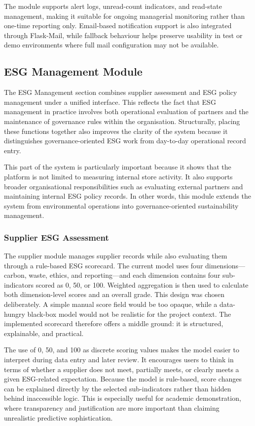 \documentclass[11pt,a4paper]{article}
\begin{document}
The module supports alert logs, unread-count indicators, and read-state management, making it suitable for ongoing managerial monitoring rather than one-time reporting only. Email-based notification support is also integrated through Flask-Mail, while fallback behaviour helps preserve usability in test or demo environments where full mail configuration may not be available.

\subsection{ESG Management Module}
The ESG Management section combines supplier assessment and ESG policy management under a unified interface. This reflects the fact that ESG management in practice involves both operational evaluation of partners and the maintenance of governance rules within the organisation. Structurally, placing these functions together also improves the clarity of the system because it distinguishes governance-oriented ESG work from day-to-day operational record entry.

This part of the system is particularly important because it shows that the platform is not limited to measuring internal store activity. It also supports broader organisational responsibilities such as evaluating external partners and maintaining internal ESG policy records. In other words, this module extends the system from environmental operations into governance-oriented sustainability management.

\subsubsection{Supplier ESG Assessment}
The supplier module manages supplier records while also evaluating them through a rule-based ESG scorecard. The current model uses four dimensions---carbon, waste, ethics, and reporting---and each dimension contains four sub-indicators scored as 0, 50, or 100. Weighted aggregation is then used to calculate both dimension-level scores and an overall grade. This design was chosen deliberately. A simple manual score field would be too opaque, while a data-hungry black-box model would not be realistic for the project context. The implemented scorecard therefore offers a middle ground: it is structured, explainable, and practical.

The use of 0, 50, and 100 as discrete scoring values makes the model easier to interpret during data entry and later review. It encourages users to think in terms of whether a supplier does not meet, partially meets, or clearly meets a given ESG-related expectation. Because the model is rule-based, score changes can be explained directly by the selected sub-indicators rather than hidden behind inaccessible logic. This is especially useful for academic demonstration, where transparency and justification are more important than claiming unrealistic predictive sophistication.
\end{document}
